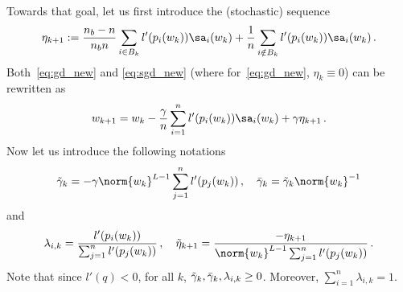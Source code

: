 Towards that goal, let us first introduce the (stochastic) sequence
\begin{equation}\label{eq:noise}
  \eta_{k+1} := {\frac{n_b - n}{n_b n}} \sum_{i \in B_k} l'(p_i(w_k)) \sa_i(w_k) + \frac{1}{n}\sum_{i \notin B_k} l'(p_i(w_k)) \sa_i(w_k)\, .
\end{equation}
Both~\eqref{eq:gd_new} and \eqref{eq:sgd_new} (where for~\eqref{eq:gd_new}, $\eta_{k} \equiv 0$) can be rewritten as 
\begin{equation}\label{eq:sgd_noise}
  w_{k+1} = w_k - \frac{\gamma}{n}  \sum_{i=1}^n l'(p_i(w_k))\sa_i(w_k)+ \gamma \eta_{k+1}\, .
\end{equation}
Now let us introduce the following notations 
\begin{equation}\label{def:reparm_gamma}
  \tgamma_k = -\gamma \norm{w_k}^{L-1} \sum_{j=1}^n l'(p_j(w_k)) \, , \quad \bgamma_k = \tgamma_k\norm{w_k}^{-1}
\end{equation}
and 
\begin{equation}\label{eq:def_lmk_tilel}
  \lambda_{i,k} = \frac{l'(p_i(w_k))}{\sum_{j=1}^n l'(p_j(w_k))} \, , \quad \tilde{\eta}_{k+1} = \frac{-\eta_{k+1}}{\norm{w_k}^{L-1} \sum_{j=1}^n l'(p_j(w_k))}\, .
\end{equation}
Note that since $l'(q) <0$, for all $k$,  $\tilde{\gamma}_k, \bar{\gamma}_k, \lambda_{i,k} \geq 0$. Moreover, $\sum_{i=1}^n\lambda_{i,k} = 1$.

